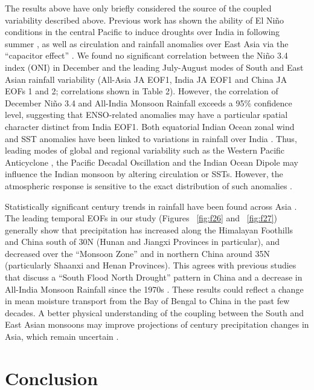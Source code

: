 	The results above have only briefly considered the source of the coupled variability described above. Previous work has shown the ability of El Ni\~no conditions in the central Pacific to induce droughts over India in following summer \citep{Kumar2006}, as well as circulation and rainfall anomalies over East Asia via the ``capacitor effect'' \citep{Xie2009}. We found no significant correlation between the Ni\~no 3.4 index (ONI) in December and the leading July-August modes of South and East Asian rainfall variability (All-Asia JA EOF1, India JA EOF1 and China JA EOFs 1 and 2; correlations shown in Table 2). However, the correlation of December Ni\~no 3.4 and All-India Monsoon Rainfall exceeds a 95\% confidence level, suggesting that ENSO-related anomalies may have a particular spatial character distinct from India EOF1. Both equatorial Indian Ocean zonal wind and SST anomalies have been linked to variations in rainfall over India \citep{Ihara2007,Mishra2012}. Thus, leading modes of global and regional variability such as the Western Pacific Anticyclone \citep{Kosaka2011}, the Pacific Decadal Oscillation \citep{Mantua2002} and the Indian Ocean Dipole \citep{Saji1999} may influence the Indian monsoon by altering circulation or SSTs. However, the atmospheric response is sensitive to the exact distribution of such anomalies \citep{Xie2009}.
	
	Statistically significant  century trends in rainfall have been found across Asia \citep{Christensen2011,Singh2014}. The leading temporal EOFs in our study (Figures ~\ref{fig:f26} and ~\ref{fig:f27}) generally show that precipitation has increased along the Himalayan Foothills and China south of 30\textdegree N (Hunan and Jiangxi Provinces in particular), and decreased over the ``Monsoon Zone'' and in northern China around 35\textdegree N (particularly Shaanxi and Henan Provinces). This agrees with previous studies that discuss a ``South Flood North Drought'' pattern in China \citep{Ding2008} and a decrease in All-India Monsoon Rainfall since the 1970s \citep{Annamalai2013}. These results could reflect a change in mean moisture transport from the Bay of Bengal to China in the past few decades. A better physical understanding of the coupling between the South and East Asian monsoons may improve projections of  century precipitation changes in Asia, which remain uncertain \citep{Christensen2011}.

\section{Conclusion}


